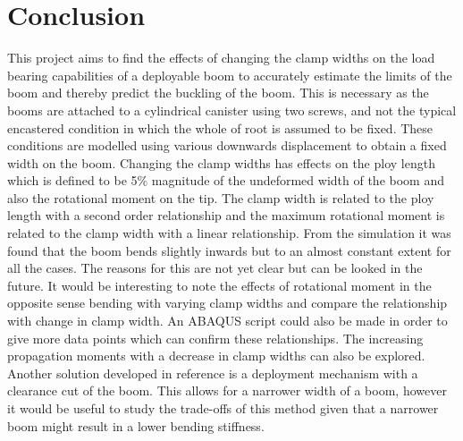 \section{Conclusion}
\label{sec:conclusion}
This project aims to find the effects of changing the clamp widths on the load bearing capabilities of a deployable boom to accurately estimate the limits of the boom and thereby predict the buckling of the boom. This is necessary as the booms are attached to a cylindrical canister using two screws, and not the typical encastered condition in which the whole of root is assumed to be fixed. These conditions are modelled using various downwards displacement to obtain a fixed width on the boom. Changing the clamp widths has effects on the ploy length which is defined to be 5\% magnitude of the undeformed width of the boom and also the rotational moment on the tip. The clamp width is related to the ploy length with a second order relationship and the maximum rotational moment is related to the clamp width with a linear relationship. 
From the simulation it was found that the boom bends slightly inwards but to an almost constant extent for all the cases. The reasons for this are not yet clear but can be looked in the future. It would be interesting to note the effects of rotational moment in the opposite sense bending with varying clamp widths and compare the relationship with change in clamp width. An ABAQUS script could also be made in order to give more data points which can confirm these relationships. The increasing propagation moments with a decrease in clamp widths can also be explored. Another solution developed in reference \cite{Footdale2014} is a deployment mechanism with a clearance cut of the boom. This allows for a narrower width of a boom, however it would be useful to study the trade-offs of this method given that a narrower boom might result in a lower bending stiffness. 

